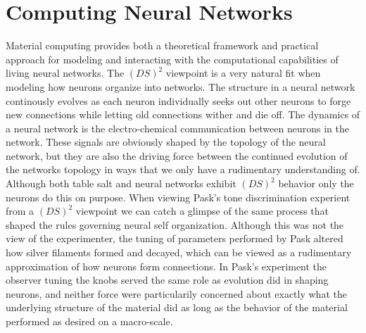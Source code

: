 \section{Computing Neural Networks}
Material computing provides both a theoretical framework and practical
approach for modeling and interacting with the computational capabilities of
living neural networks.
%
The $(DS)^2$ viewpoint is a very natural fit when modeling how neurons organize
into networks.
The structure in a neural network continously evolves as each neuron
individually seeks out other neurons to forge new connections while letting old
connections wither and die off.
The dynamics of a neural network is the electro-chemical communication between
neurons in the network.
These signals are obviously shaped by the topology of the neural network, but
they are also the driving force between the continued evolution of the networks
topology in ways that we only have a rudimentary understanding of.
%
Although both table salt and neural networks exhibit $(DS)^2$ behavior only the
neurons do this on purpose.
When viewing Pask's tone discrimination experient from a $(DS)^2$ viewpoint we
can catch a glimpse of the same process that shaped the rules governing neural
self organization.
Although this was not the view of the experimenter, the tuning of parameters
performed by Pask altered how silver filaments formed and decayed, which can be
viewed as a rudimentary approximation of how neurons form connections.
%
In Pask's experiment the observer tuning the knobs served the same role as
evolution did in shaping neurons, and neither force were particularily concerned
about exactly what the underlying structure of the material did as long as the
behavior of the material performed as desired on a macro-scale.
%
